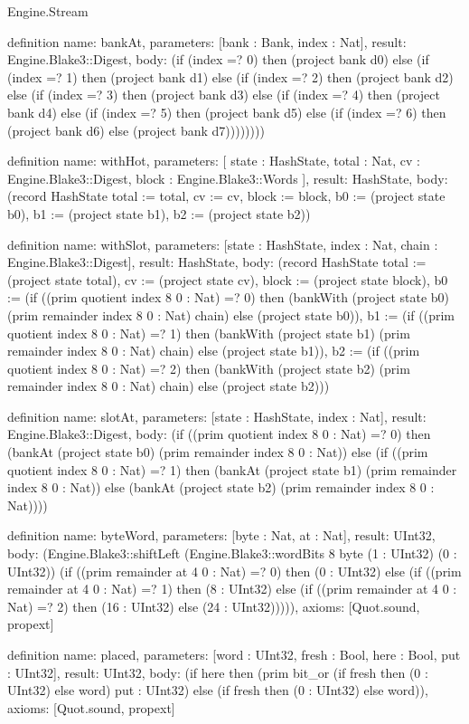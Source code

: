 \begin{lexlean}{Engine.Stream}
\begin{semanticmodule}
definition{
  name: bankAt,
  parameters: [bank : Bank, index : Nat],
  result: Engine.Blake3::Digest,
  body: (if (index =? 0) then (project bank d0) else (if (index =? 1) then (project bank d1) else (if (index =? 2) then (project bank d2) else (if (index =? 3) then (project bank d3) else (if (index =? 4) then (project bank d4) else (if (index =? 5) then (project bank d5) else (if (index =? 6) then (project bank d6) else (project bank d7))))))))
}

definition{
  name: withHot,
  parameters: [
    state : HashState,
    total : Nat,
    cv : Engine.Blake3::Digest,
    block : Engine.Blake3::Words
  ],
  result: HashState,
  body: (record HashState {total := total, cv := cv, block := block, b0 := (project state b0), b1 := (project state b1), b2 := (project state b2)})
}

definition{
  name: withSlot,
  parameters: [state : HashState, index : Nat, chain : Engine.Blake3::Digest],
  result: HashState,
  body: (record HashState {total := (project state total), cv := (project state cv), block := (project state block), b0 := (if ((prim quotient index 8 0 : Nat) =? 0) then (bankWith (project state b0) (prim remainder index 8 0 : Nat) chain) else (project state b0)), b1 := (if ((prim quotient index 8 0 : Nat) =? 1) then (bankWith (project state b1) (prim remainder index 8 0 : Nat) chain) else (project state b1)), b2 := (if ((prim quotient index 8 0 : Nat) =? 2) then (bankWith (project state b2) (prim remainder index 8 0 : Nat) chain) else (project state b2))})
}

definition{
  name: slotAt,
  parameters: [state : HashState, index : Nat],
  result: Engine.Blake3::Digest,
  body: (if ((prim quotient index 8 0 : Nat) =? 0) then (bankAt (project state b0) (prim remainder index 8 0 : Nat)) else (if ((prim quotient index 8 0 : Nat) =? 1) then (bankAt (project state b1) (prim remainder index 8 0 : Nat)) else (bankAt (project state b2) (prim remainder index 8 0 : Nat))))
}

definition{
  name: byteWord,
  parameters: [byte : Nat, at : Nat],
  result: UInt32,
  body: (Engine.Blake3::shiftLeft (Engine.Blake3::wordBits 8 byte (1 : UInt32) (0 : UInt32)) (if ((prim remainder at 4 0 : Nat) =? 0) then (0 : UInt32) else (if ((prim remainder at 4 0 : Nat) =? 1) then (8 : UInt32) else (if ((prim remainder at 4 0 : Nat) =? 2) then (16 : UInt32) else (24 : UInt32))))),
  axioms: [Quot.sound, propext]
}

definition{
  name: placed,
  parameters: [word : UInt32, fresh : Bool, here : Bool, put : UInt32],
  result: UInt32,
  body: (if here then (prim bit_or (if fresh then (0 : UInt32) else word) put : UInt32) else (if fresh then (0 : UInt32) else word)),
  axioms: [Quot.sound, propext]
}


\end{semanticmodule}
\end{lexlean}
